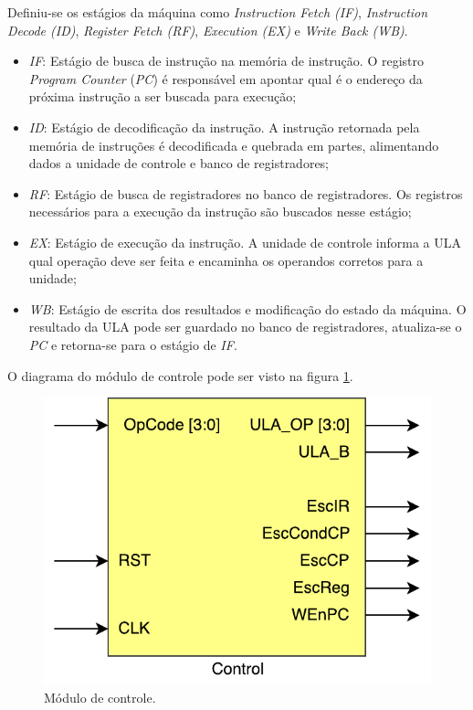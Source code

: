 \documentclass[11pt,a4paper,titlepage]{article}
\begin{document}
Definiu-se os estágios da máquina como \textit{Instruction Fetch (IF)}, \textit{Instruction Decode (ID)}, \textit{Register Fetch (RF)}, \textit{Execution (EX)} e \textit{Write Back (WB)}.

\begin{itemize}
\item \textit{IF}: Estágio de busca de instrução na memória de instrução. O registro \textit{Program Counter} (\textit{PC}) é responsável em apontar qual é o endereço da próxima instrução a ser buscada para execução;
\item \textit{ID}: Estágio de decodificação da instrução. A instrução retornada pela memória de instruções é decodificada e quebrada em partes, alimentando dados a unidade de controle e banco de registradores;
\item \textit{RF}: Estágio de busca de registradores no banco de registradores. Os registros necessários para a execução da instrução são buscados nesse estágio;
\item \textit{EX}: Estágio de execução da instrução. A unidade de controle informa a ULA qual operação deve ser feita e encaminha os operandos corretos para a unidade;
\item \textit{WB}: Estágio de escrita dos resultados e modificação do estado da máquina. O resultado da ULA pode ser guardado no banco de registradores, atualiza-se o \textit{PC} e retorna-se para o estágio de \textit{IF}.
\end{itemize}

O diagrama do módulo de controle pode ser visto na figura \ref{fig:control}.

\begin{figure}[!h]
\centering
\includegraphics[scale=0.5]{images/Control.pdf}
\caption{Módulo de controle.}
\label{fig:control}
\end{figure}
\end{document}
